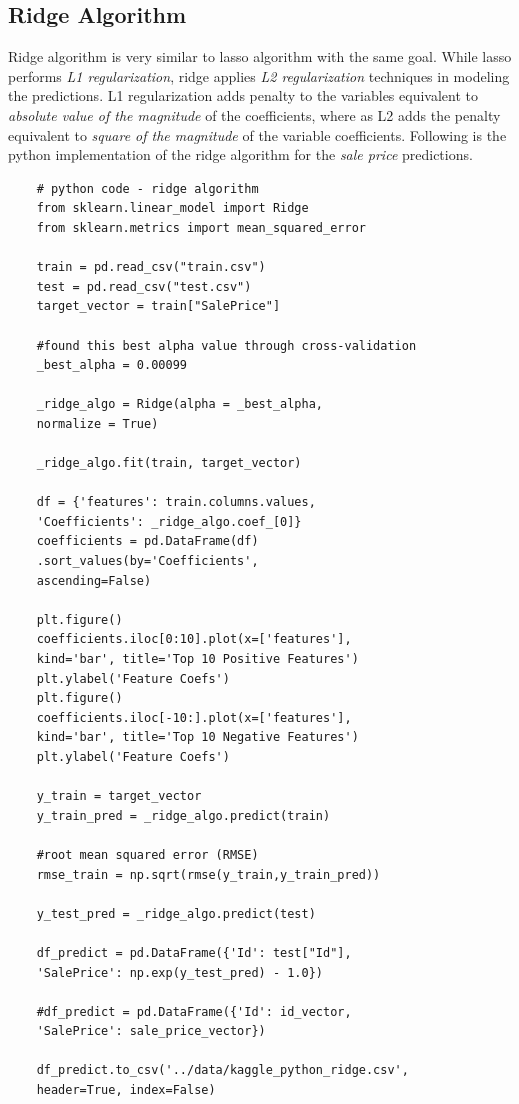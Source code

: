 \documentclass[sigconf]{acmart}
\begin{document}
	
	\subsection{Ridge Algorithm}
	
	Ridge algorithm is very similar to lasso algorithm with the same goal. While lasso performs {\em L1 regularization}, ridge applies {\em L2 regularization} techniques in modeling the predictions. L1 regularization adds penalty to the variables equivalent to {\em absolute value of the magnitude} of the coefficients, where as L2 adds the penalty equivalent to {\em square of the magnitude} of the variable coefficients. Following is the python implementation of the ridge algorithm for the {\em sale price} predictions. 
	
	\begin{verbatim}
	# python code - ridge algorithm
	from sklearn.linear_model import Ridge
	from sklearn.metrics import mean_squared_error
	
	train = pd.read_csv("train.csv")
	test = pd.read_csv("test.csv")
	target_vector = train["SalePrice"]
	
	#found this best alpha value through cross-validation
	_best_alpha = 0.00099
	
	_ridge_algo = Ridge(alpha = _best_alpha, 
	normalize = True)		
	
	_ridge_algo.fit(train, target_vector)   
	
	df = {'features': train.columns.values, 
	'Coefficients': _ridge_algo.coef_[0]}	          
	coefficients = pd.DataFrame(df)
	.sort_values(by='Coefficients', 
	ascending=False)
	
	plt.figure()
	coefficients.iloc[0:10].plot(x=['features'], 
	kind='bar', title='Top 10 Positive Features')	                 
	plt.ylabel('Feature Coefs')	
	plt.figure()
	coefficients.iloc[-10:].plot(x=['features'], 
	kind='bar', title='Top 10 Negative Features')
	plt.ylabel('Feature Coefs')
	
	y_train = target_vector
	y_train_pred = _ridge_algo.predict(train)
	
	#root mean squared error (RMSE)
	rmse_train = np.sqrt(rmse(y_train,y_train_pred))	
	
	y_test_pred = _ridge_algo.predict(test)
	
	df_predict = pd.DataFrame({'Id': test["Id"], 
	'SalePrice': np.exp(y_test_pred) - 1.0})
	
	#df_predict = pd.DataFrame({'Id': id_vector, 
	'SalePrice': sale_price_vector})
	
	df_predict.to_csv('../data/kaggle_python_ridge.csv',
	header=True, index=False)	
	\end{verbatim}
	
\end{document}
